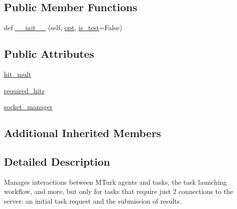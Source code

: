 \subsection*{Public Member Functions}
\begin{DoxyCompactItemize}
\item 
def \hyperlink{classparlai_1_1mturk_1_1core_1_1legacy__2018_1_1mturk__manager_1_1StaticMTurkManager_a4a658ba3ab68e770cb5dcccdd272aa3b}{\+\_\+\+\_\+init\+\_\+\+\_\+} (self, \hyperlink{classparlai_1_1mturk_1_1core_1_1legacy__2018_1_1mturk__manager_1_1MTurkManager_a4ae5366245bb4ddfeb732140e1a0df10}{opt}, \hyperlink{classparlai_1_1mturk_1_1core_1_1legacy__2018_1_1mturk__manager_1_1MTurkManager_a1bbfe2403cd6c1c0d967e00d313e8786}{is\+\_\+test}=False)
\end{DoxyCompactItemize}
\subsection*{Public Attributes}
\begin{DoxyCompactItemize}
\item 
\hyperlink{classparlai_1_1mturk_1_1core_1_1legacy__2018_1_1mturk__manager_1_1StaticMTurkManager_af82dc6428ef8050ce1932a452d728936}{hit\+\_\+mult}
\item 
\hyperlink{classparlai_1_1mturk_1_1core_1_1legacy__2018_1_1mturk__manager_1_1StaticMTurkManager_aff32644e98ae2b42a14e4537035bfc12}{required\+\_\+hits}
\item 
\hyperlink{classparlai_1_1mturk_1_1core_1_1legacy__2018_1_1mturk__manager_1_1StaticMTurkManager_aa1c3f5147008b0e954d5d8a66f94e011}{socket\+\_\+manager}
\end{DoxyCompactItemize}
\subsection*{Additional Inherited Members}


\subsection{Detailed Description}
\begin{DoxyVerb}Manages interactions between MTurk agents and tasks, the task launching workflow,
and more, but only for tasks that require just 2 connections to the server: an
initial task request and the submission of results.
\end{DoxyVerb}
 

